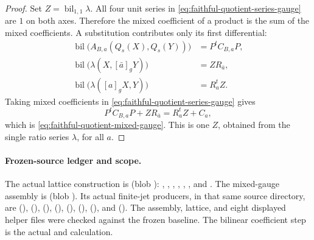 \begin{proof}
Set \(Z=\operatorname{bil}_{1,1}\lambda\).
All four unit series in
\eqref{eq:faithful-quotient-series-gauge} are \(1\)
on both axes.  Therefore the mixed coefficient of a product
is the sum of the mixed coefficients.
A substitution contributes only its first differential:
\[
 \begin{split}
 \operatorname{bil}\bigl(A_{B,a}(Q_s(X),Q_s(Y))\bigr)
                                  &=P^t C_{B,a}P,\\
 \operatorname{bil}\bigl(\lambda(X,[\bar a]_gY)\bigr)
                                  &=Z R_{\bar a},\\
 \operatorname{bil}\bigl(\lambda([a]_gX,Y)\bigr)
                                  &=R_a^t Z.
 \end{split}
\]
Taking mixed coefficients in
\eqref{eq:faithful-quotient-series-gauge} gives
\[
                    P^t C_{B,a}P+Z R_{\bar a}=R_a^t Z+C_a,
\]
which is \eqref{eq:faithful-quotient-mixed-gauge}.
This is one \(Z\), obtained from the single ratio series
\(\lambda\), for all \(a\).
\end{proof}

\paragraph{Frozen-source ledger and scope.}
The actual lattice construction is
\href{https://github.com/ChristianKudeba/alpoge-rh-verification/blob/alpoge-source-7cbf7a0c/src/Development/AutomorphicSpectrum/Proofs/GeometryProofs/AbelianQuotientLattice.lean}
{}
(blob ):
, ,
, ,
, , and
.
The mixed-gauge assembly is
\href{https://github.com/ChristianKudeba/alpoge-rh-verification/blob/alpoge-source-7cbf7a0c/src/Development/AutomorphicSpectrum/Proofs/GeometryProofs/AbelianQuotientBilinear.lean}
{}
(blob ).
Its actual finite-jet producers, in that same source directory, are
(),
(),
(),
(),
(),
(),
(),
and 
().
The assembly, lattice, and eight displayed helper files were checked
against the frozen baseline.
The bilinear coefficient step is the actual
 and
 calculation.

